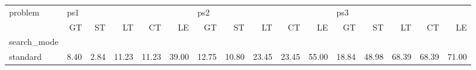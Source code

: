 \begin{tabular}{lrrrrrrrrrrrrrrr}
\toprule
problem & \multicolumn{5}{l}{ps1} & \multicolumn{5}{l}{ps2} & \multicolumn{5}{l}{ps3} \\
{} &   GT &   ST &    LT &    CT &    LE &    GT &    ST &    LT &    CT &    LE &    GT &    ST &    LT &    CT &    LE \\
search\_mode &      &      &       &       &       &       &       &       &       &       &       &       &       &       &       \\
\midrule
standard    & 8.40 & 2.84 & 11.23 & 11.23 & 39.00 & 12.75 & 10.80 & 23.45 & 23.45 & 55.00 & 18.84 & 48.98 & 68.39 & 68.39 & 71.00 \\
\bottomrule
\end{tabular}
